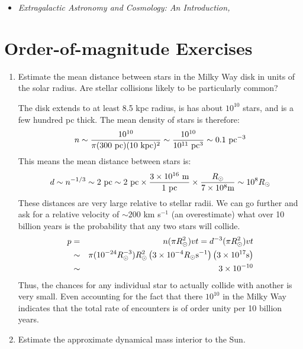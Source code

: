 \begin{itemize}
  \item {\it Extragalactic Astronomy and Cosmology: An Introduction,
    \citet{schneider15a}}
\end{itemize}

\section{Order-of-magnitude Exercises}

\begin{enumerate} 
\item Estimate the mean distance between stars in the Milky Way disk
  in units of the solar radius. Are stellar collisions likely to be
  particularly common?

\begin{answer}
The disk extends to at least 8.5 kpc radius, is has about $10^{10}$
stars, and is a few hundred pc thick. The mean density of stars is
therefore:
\begin{equation}
n \sim \frac{10^{10}}{\pi (300 {\rm ~pc}) (10 {\rm ~kpc})^2} \sim
\frac{10^{10}}{10^{11} {\rm ~pc}^3} \sim  0.1 {\rm ~pc}^{-3} 
\end{equation}
This means the mean distance between stars is:
\begin{equation}
d \sim n^{-1/3} \sim 2 {\rm ~pc} \sim 2 {\rm ~pc} \times \frac{3 \times
  10^{16} {\rm ~m}}{1 {\rm ~pc}} \times \frac{R_\odot}{7 \times 10^8 {\rm
    m}}
\sim 10^8 R_\odot
\end{equation}
These distances are very large relative to stellar radii. We can go
further and ask for a relative velocity of $\sim 200$ km s$^{-1}$ (an
overestimate) what over 10 billion years is the probability that any
two stars will collide.
\begin{eqnarray}
  p &=& n (\pi R_\odot^2) v t = d^{-3} (\pi R_\odot^2) v t \cr
  &\sim& \pi (10^{-24} R_\odot^{-3}) R_\odot^2 \left(3 \times
  10^{-4} R_\odot {\rm s}^{-1}\right) \left(3 \times 10^{17} {\rm
    s}\right) \cr
  &\sim& 3 \times 10^{-10} 
\end{eqnarray}
Thus, the chances for any individual star to actually collide with
another is very small. Even accounting for the fact that there
$10^{10}$ in the Milky Way indicates that the total rate of encounters
is of order unity per 10 billion years.
\end{answer}
\item Estimate the approximate dynamical mass interior to the Sun. 


\end{enumerate}
